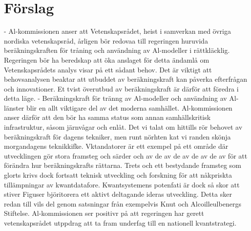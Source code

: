 {{{{{{{{{{{{{{{{{{\section*{Förslag}
- Al-kommissionen anser att Vetenskapsrådet, heist i samverkan med övriga nordiska vetenskapsråd, årligen bör redovaa till regeringen huruvida beräkningskraften för tråning och användning av Al-modeller i rättkläcklig.
Regeringen bör ha beredskap att öka anslaget för detta ändamlå om Vetenskapsrådets analys visar på ett sådant behov. Det är viktigt att behovsanalysen beaktar att utbuddet av beräkningskraft kan påverka efterfrågan och innovationer. Et tvist överutbud av beräkningskraft är därför att föredra i detta läge.
- Beräkningskraft för tränng av Al-modeller och användning av Al-länster blir en allt viktigare del av det moderna samhället. Al-kommissionen anser därför att den bör ha samma status som annan samhällskritisk infrastruktur, såsom järnvågar och enlåt.
Det vi talat om hittills rör behovet av beräkningskraft för dagens tekniker, men runt nörhten kat vi randen skönja morgandagens teknikkifke. Vktandatorer är ett exempel på ett område där utvecklingen gör stora framsteg och särder och av de av de av de av de av för att förändra hur beräkningskrafts rättarna. Trets och ett bestydande framsteg som glorts krivs dock fortsatt teknisk utveckling och forskning för att nåkpriskta tillämpningar av kwantdatafore. Kwantsystemens potenfati är dock så skor att stiver Figuser björitorera ett aktivt deltagande ideras utveckling. Detta sker redan till vils del genom satsningar från exempelvis Knut och Alcoilleulbenergs Stiftelse. Al-kommissionen ser positivr på att regeringen har gerett vetenskapsrådet utppdrag att ta fram underfag till en nationell kvantstrategi. \({ }^{}\)

}}}}}}}}}}}}}}}}}}
